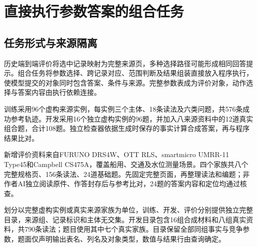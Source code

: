 \section{直接执行参数答案的组合任务}
\label{sec:domain-task-data}

\subsection{任务形式与来源隔离}

历史端到端评价将选中记录映射为完整来源页，多种选择路径可能形成相同回答提示。组合任务将参数选择、跨记录对应、范围判断及结果组装直接放入程序执行，使模型提交的对象同时包含答案、条件与来源。完整参数表成为评价对象，动作选择与答案内容由执行依赖连接。

训练采用96个虚构来源实例，每实例三个主体、18条读法及六类问题，共576条成功参考轨迹。开发采用16个独立虚构实例的96题，并加入八来源资料中的12道真实组合题，合计108题。独立检查器依据生成时保存的事实计算合成答案，再与程序结果比对。

新增评价资料来自FURUNO DRS4W、OTT RLS、smartmicro UMRR-11 Type45和Campbell CS475A\cite{source-v3-furuno-drs4w,source-v3-ott-rls,source-v3-smartmicro-umrr11,source-v3-campbell-cs475a}，覆盖船用、交通及水位测量场景。四个家族共八个完整规格页、156条读法、24道基础题。先固定完整页面，再整理读法和编题；非作者AI独立阅读原件、作答封存后与参考比对，24题的答案内容和定位均通过核查。

\begin{table}[htbp]
\centering\small
\caption{组合任务的来源隔离划分}
\label{tab:offline-split}
\OfflineSplitTable
\end{table}

划分以完整虚构实例或真实来源家族为单位，训练、开发、评价分别提供独立完整目录，来源组、记录标识和主体无交集。开发目录包含16组合成材料和八组真实资料，共790条读法；题目使用其中七个真实家族。目录保留全部同组事实与竞争参数，题面仅声明输出表名、列名及对象类型，数值与结果行由查询确定。


